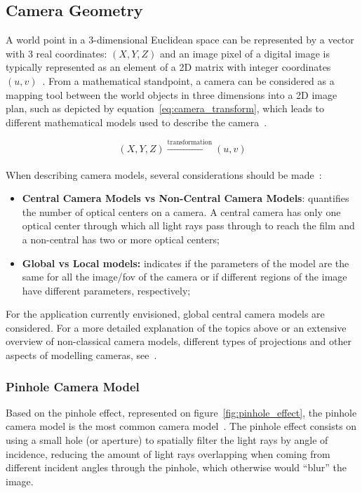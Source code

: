 \subsection{Camera Geometry}
\label{subsec:sota:camera-geometry}
A world point in a 3-dimensional Euclidean space can be represented by a vector with 3 real coordinates: $(X, Y, Z)$ and an image pixel of a digital image is typically represented as an element of a 2D matrix with integer coordinates $(u, v)$~\cite{mvg_book}. From a mathematical standpoint, a camera can be considered as a mapping tool between the world objects in three dimensions into a 2D image plan, such as depicted by equation~\eqref{eq:camera_transform}, which leads to different mathematical models used to describe the camera~\cite{mvg_book, Sturm2010}.

\begin{equation}
	\label{eq:camera_transform}
	(X, Y, Z) \xrightarrow[]{\text{transformation}} (u, v)
\end{equation}

When describing camera models, several considerations should be made~\cite{Sturm2010}:
\begin{itemize}
	\item \textbf{Central Camera Models vs Non-Central Camera Models}: quantifies the number of optical centers on a camera. A central camera has only one optical center through which all light rays pass through to reach the film and a non-central has two or more optical centers;
	\item \textbf{Global vs Local models:} indicates if the parameters of the model are the same for all the image/\ac{fov} of the camera or if different regions of the image have different parameters, respectively;
\end{itemize}

For the application currently envisioned, global central camera models are considered. For a more detailed explanation of the topics above or an extensive overview of non-classical camera models, different types of projections and other aspects of modelling cameras, see~\cite{Sturm2010, camera_models}.

\subsubsection{Pinhole Camera Model}
Based on the pinhole effect, represented on figure~\ref{fig:pinhole_effect}, the pinhole camera model is the most common camera model~\cite{camera_models}. The pinhole effect consists on using a small hole (or aperture) to spatially filter the light rays by angle of incidence, reducing the amount of light rays overlapping when coming from different incident angles through the pinhole, which otherwise would ``blur'' the image. 

